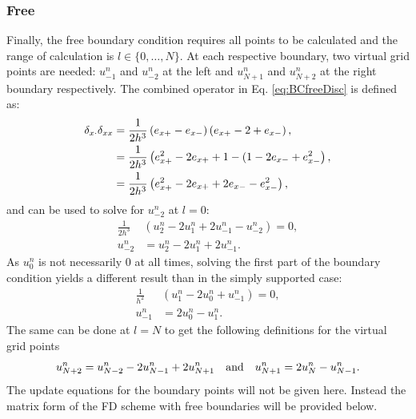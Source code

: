 \subsubsection{Free}
Finally, the free boundary condition requires all points to be calculated and the range of calculation is $l\in\{0, \hdots, N\}$. At each respective boundary, two virtual grid points are needed: $u_{-1}^n$ and $u_{-2}^n$ at the left and $u_{N+1}^n$ and $u_{N+2}^n$ at the right boundary respectively.
The combined operator in Eq. \eqref{eq:BCfreeDisc} is defined as:
\begin{align}
    \delta_{x\cdot}\delta_{xx} &= \frac{1}{2h^3}\left(e_{x+}-e_{x-}\right)\left(e_{x+}-2+e_{x-}\right),\nonumber\\
    &=\frac{1}{2h^3}\left(e_{x+}^2 - 2e_{x+} + 1 - (1 - 2e_{x-} + e_{x-}^2\right),\nonumber\\
    &=\frac{1}{2h^3}\left(e_{x+}^2 - 2e_{x+} + 2e_{x-} -e_{x-}^2\right),
\end{align}
and can be used to solve for $u_{-2}^n$ at $l=0$:
\begin{align*}
    \frac{1}{2h^3} &\left(u_2^n - 2 u_1^n + 2u_{-1}^n - u_{-2}^n\right) = 0,\\%
    u_{-2}^n &= u_2^n - 2 u_1^n + 2u_{-1}^n.
\end{align*}
As $u_0^n$ is not necessarily $0$ at all times, solving the first part of the boundary condition yields a different result than in the simply supported case:
\begin{align*}
    \frac{1}{h^2} &\left(u_1^n - 2 u_0^n + u_{-1}^n \right) = 0,\\
    u_{-1}^n &= 2u_0^n - u_1^n.
\end{align*}
The same can be done at $l=N$ to get the following definitions for the virtual grid points
\begin{equation*}
    u_{N+2}^n = u_{N-2}^n - 2 u_{N-1}^n + 2u_{N+1}^n
    \quad \text{and} \quad u_{N+1}^n = 2u_N^n - u_{N-1}^n.
\end{equation*}
The update equations for the boundary points will not be given here. Instead the matrix form of the FD scheme with free boundaries will be provided below. 
